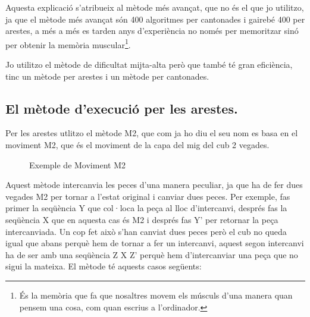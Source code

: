 Aquesta explicació s'atribueix al mètode més avançat, que no és el que jo utilitzo, ja que el mètode més avançat són 400 algoritmes per cantonades i gairebé 400 per arestes, a més a més es tarden anys d'experiència no només per memoritzar sinó per obtenir la memòria muscular\footnote{És la memòria que fa que nosaltres movem els músculs d'una manera quan pensem una cosa, com quan escrius a l'ordinador.}.

Jo utilitzo el mètode de dificultat mijta-alta però que també té gran eficiència, tinc un mètode per arestes i un mètode per cantonades.

\subsection{El mètode d'execució per les arestes.}

Per les arestes utlitzo el mètode M2, que com ja ho diu el seu nom es basa en el moviment M2, que és el moviment de la capa del mig del cub 2 vegades.

\begin{figure}[h]
    \centering\RubikCubeSolvedWY
    \caption{Exemple de Moviment M2}
\end{figure}
    
Aquest mètode intercanvia les peces d'una manera peculiar, ja que ha de fer dues vegades M2 per tornar a l'estat original i canviar dues peces. Per exemple, fas primer la seqüència Y que col·loca la peça al lloc d'intercanvi, després fas la seqüència X que en aquesta cas és M2 i després fas Y' per retornar la peça intercanviada. Un cop fet això s'han canviat dues peces però el cub no queda igual que abans perquè hem de tornar a fer un intercanvi, aquest segon intercanvi ha de ser amb una seqüència Z X Z' perquè hem d'intercanviar una peça que no sigui la mateixa.
El mètode té aquests casos següents:

